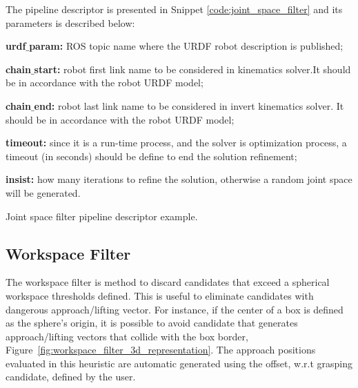 The pipeline descriptor is presented in Snippet \ref{code:joint_space_filter} and its parameters is described below:
\begin{itemize_jp}
    \item \textbf{urdf$\_$param:} ROS topic name where the URDF robot description is published;
    \item \textbf{chain$\_$start:} robot first link name to be considered in kinematics solver.It should be in accordance with the robot URDF model;
    \item \textbf{chain$\_$end:} robot last link name to be considered in invert kinematics solver. It should be in accordance with the robot URDF model;
    \item \textbf{timeout:} since it is a run-time process, and the solver is optimization process, a timeout (in seconds) should be define to end the solution refinement;
    \item \textbf{insist:} how many  iterations to refine the solution, otherwise a random joint space will be generated.
\end{itemize_jp}


\begin{snippet}[h!]
\centering
{}
\caption{Joint space filter pipeline descriptor example.}
\label{code:joint_space_filter}
\end{snippet}


\subsection{Workspace Filter}
\label{cap4:modular_grasping_architecture:sec:grasp_selection:subsec:workspace_filter}

The workspace filter is method to discard candidates that exceed a spherical workspace thresholds defined. This is useful to eliminate candidates with dangerous approach/lifting vector. For instance, if the center of a box is defined as the sphere's origin, it is possible to avoid candidate that generates approach/lifting vectors that collide with the box border, Figure~\ref{fig:workspace_filter_3d_representation}. The approach positions evaluated in this heuristic are automatic generated using the offset, w.r.t grasping candidate, defined by the user.

